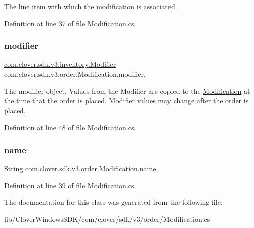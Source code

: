The line item with which the modification is associated 



Definition at line 37 of file Modification.\+cs.

\mbox{\label{classcom_1_1clover_1_1sdk_1_1v3_1_1order_1_1_modification_a56419d1dc4c9a9c813a1d5a2bc86e9c8}} 
\subsubsection{\texorpdfstring{modifier}{modifier}}
{\footnotesize\ttfamily \hyperlink{classcom_1_1clover_1_1sdk_1_1v3_1_1inventory_1_1_modifier}{com.\+clover.\+sdk.\+v3.\+inventory.\+Modifier} com.\+clover.\+sdk.\+v3.\+order.\+Modification.\+modifier\hspace{0.3cm}{\ttfamily [get]}, {\ttfamily [set]}}



The modifier object. Values from the Modifier are copied to the \hyperlink{classcom_1_1clover_1_1sdk_1_1v3_1_1order_1_1_modification}{Modification} at the time that the order is placed. Modifier values may change after the order is placed. 



Definition at line 48 of file Modification.\+cs.

\mbox{\label{classcom_1_1clover_1_1sdk_1_1v3_1_1order_1_1_modification_a84546632f263029c7a5619695654f077}} 
\subsubsection{\texorpdfstring{name}{name}}
{\footnotesize\ttfamily String com.\+clover.\+sdk.\+v3.\+order.\+Modification.\+name\hspace{0.3cm}{\ttfamily [get]}, {\ttfamily [set]}}



Definition at line 39 of file Modification.\+cs.



The documentation for this class was generated from the following file\+:\begin{DoxyCompactItemize}
\item 
lib/\+Clover\+Windows\+S\+D\+K/com/clover/sdk/v3/order/Modification.\+cs\end{DoxyCompactItemize}
